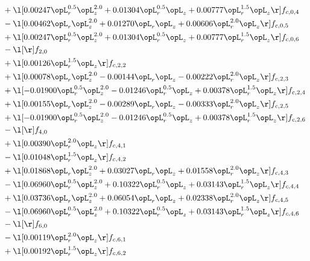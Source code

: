 \begin{alignat}{2}
& + \l[  0.00247 \opL_r^{0.5} \opL_z^{2.0} +  0.01304 \opL_r^{0.5} \opL_z +  0.00777 \opL_r^{1.5} \opL_z  \r] f_{c,0,4} \nonumber \\ 
& - \l[  0.00462 \opL_r \opL_z^{2.0} +  0.01270 \opL_r \opL_z +  0.00606 \opL_r^{2.0} \opL_z  \r] f_{c,0,5} \nonumber \\ 
& + \l[  0.00247 \opL_r^{0.5} \opL_z^{2.0} +  0.01304 \opL_r^{0.5} \opL_z +  0.00777 \opL_r^{1.5} \opL_z  \r] f_{c,0,6} \nonumber \\ 
& - \l[  \r] f_{2,0} \nonumber \\ 
& + \l[  0.00126 \opL_r^{1.5} \opL_z  \r] f_{c,2,2} \nonumber \\ 
& + \l[  0.00078 \opL_r \opL_z^{2.0}   -0.00144 \opL_r \opL_z   -0.00222 \opL_r^{2.0} \opL_z  \r] f_{c,2,3} \nonumber \\ 
& + \l[  -0.01900 \opL_r^{0.5} \opL_z^{2.0}   -0.01246 \opL_r^{0.5} \opL_z +  0.00378 \opL_r^{1.5} \opL_z  \r] f_{c,2,4} \nonumber \\ 
& + \l[  0.00155 \opL_r \opL_z^{2.0}   -0.00289 \opL_r \opL_z   -0.00333 \opL_r^{2.0} \opL_z  \r] f_{c,2,5} \nonumber \\ 
& + \l[  -0.01900 \opL_r^{0.5} \opL_z^{2.0}   -0.01246 \opL_r^{0.5} \opL_z +  0.00378 \opL_r^{1.5} \opL_z  \r] f_{c,2,6} \nonumber \\ 
& - \l[  \r] f_{4,0} \nonumber \\ 
& + \l[  0.00390 \opL_r^{2.0} \opL_z  \r] f_{c,4,1} \nonumber \\ 
& - \l[  0.01048 \opL_r^{1.5} \opL_z  \r] f_{c,4,2} \nonumber \\ 
& + \l[  0.01868 \opL_r \opL_z^{2.0} +  0.03027 \opL_r \opL_z +  0.01558 \opL_r^{2.0} \opL_z  \r] f_{c,4,3} \nonumber \\ 
& - \l[  0.06960 \opL_r^{0.5} \opL_z^{2.0} +  0.10322 \opL_r^{0.5} \opL_z +  0.03143 \opL_r^{1.5} \opL_z  \r] f_{c,4,4} \nonumber \\ 
& + \l[  0.03736 \opL_r \opL_z^{2.0} +  0.06054 \opL_r \opL_z +  0.02338 \opL_r^{2.0} \opL_z  \r] f_{c,4,5} \nonumber \\ 
& - \l[  0.06960 \opL_r^{0.5} \opL_z^{2.0} +  0.10322 \opL_r^{0.5} \opL_z +  0.03143 \opL_r^{1.5} \opL_z  \r] f_{c,4,6} \nonumber \\ 
& - \l[  \r] f_{6,0} \nonumber \\ 
& - \l[  0.00119 \opL_r^{2.0} \opL_z  \r] f_{c,6,1} \nonumber \\ 
& + \l[  0.00192 \opL_r^{1.5} \opL_z  \r] f_{c,6,2} \nonumber \\ 

\end{alignat}
